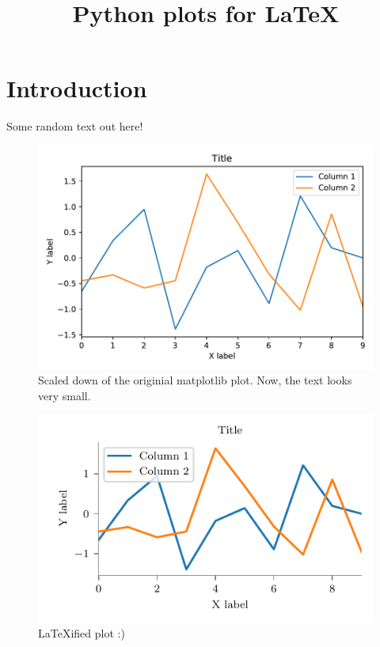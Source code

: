 \documentclass{sig-alternate}
\title{Python plots for LaTeX}
\begin{document}
\maketitle
\section{Introduction}
Some random text out here!
\noindent

\begin{figure}
\centering \includegraphics[scale=0.5]{image1.pdf}
\caption{Scaled down of the originial matplotlib plot. Now, the text looks very small.}
\label{image1}
\end{figure}

\begin{figure}
\centering \includegraphics{image2.pdf}
\caption{LaTeXified plot :)}
\label{image2}
\end{figure}
\end{document}
